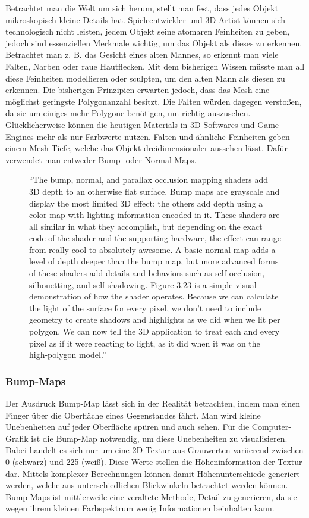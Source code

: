 Betrachtet man die Welt um sich herum, stellt man fest, dass jedes Objekt mikroskopisch kleine Details hat. Spieleentwickler und 3D-Artist können sich technologisch nicht leisten, jedem Objekt seine atomaren Feinheiten zu geben, jedoch sind essenziellen Merkmale wichtig, um das Objekt als dieses zu erkennen. Betrachtet man z. B. das Gesicht eines alten Mannes, so erkennt man viele Falten, Narben oder raue Hautflecken. Mit dem bisherigen Wissen müsste man all diese Feinheiten modellieren oder sculpten, um den alten Mann als diesen zu erkennen.\cite[3]{_highpoly_to_lowpoly} Die bisherigen Prinzipien erwarten jedoch, dass das Mesh eine möglichst geringste Polygonanzahl besitzt. Die Falten würden dagegen verstoßen, da sie um einiges mehr Polygone benötigen, um richtig auszusehen. Glücklicherweise können die heutigen Materials in 3D-Softwares und Game-Engines mehr als nur Farbwerte nutzen.
Falten und ähnliche Feinheiten geben einem Mesh Tiefe, welche das Objekt dreidimensionaler aussehen lässt. Dafür verwendet man entweder Bump -oder Normal-Maps.

\begin{figure}[H]
	\centering
"`The bump, normal, and parallax occlusion mapping shaders add 3D depth to an otherwise flat surface. Bump maps are grayscale and display the most limited 3D effect; the others add depth using a color map with lighting information encoded in it. These shaders are all similar in what they accomplish, but depending on the exact code of the shader and the supporting hardware, the effect can range from really cool to absolutely awesome. A basic normal map adds a level of depth deeper than the bump map, but more advanced forms of these shaders add details and behaviors such as self-occlusion, silhouetting, and self-shadowing. Figure 3.23 is a simple visual demonstration of how the shader operates. Because we can calculate the light of the surface for every pixel, we don’t need to include geometry to create shadows and highlights as we did when we lit per polygon. We can now tell the 3D application to treat each and every pixel as if it were reacting to light, as it did when it was on the high-polygon model."'
\cite[96]{_3DGameTextures}
\end{figure}


\subsubsection{Bump-Maps}
Der Ausdruck Bump-Map lässt sich in der Realität betrachten, indem man einen Finger über die Oberfläche eines Gegenstandes fährt. Man wird kleine Unebenheiten auf jeder Oberfläche spüren und auch sehen. Für die Computer-Grafik ist die Bump-Map notwendig, um diese Unebenheiten zu visualisieren. Dabei handelt es sich nur um eine 2D-Textur aus Grauwerten variierend zwischen 0 (schwarz) und 225 (weiß). Diese Werte stellen die Höheninformation der Textur dar. Mittels komplexer Berechnungen können damit Höhenunterschiede generiert werden, welche aus unterschiedlichen Blickwinkeln betrachtet werden können. Bump-Maps ist mittlerweile eine veraltete Methode, Detail zu generieren, da sie wegen ihrem kleinen Farbspektrum wenig Informationen beinhalten kann.\cite[86]{_3d_game_textures}

